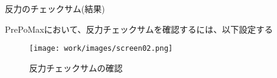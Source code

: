 \begin{frame}{反力のチェックサム(結果)}
 
  PrePoMaxにおいて、反力チェックサムを確認するには、以下設定する \\
  \begin{figure}[htbp]
    \begin{center}
      \texttt{[image: work/images/screen02.png]}
      \caption{反力チェックサムの確認}
    \end{center}
  \end{figure}
\end{frame}
